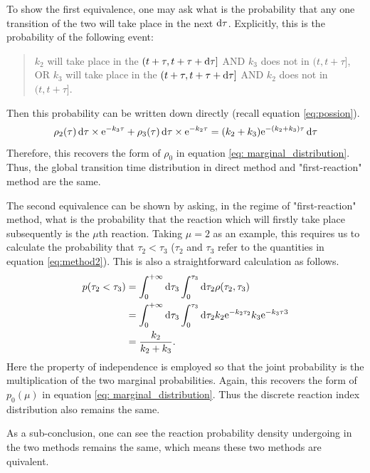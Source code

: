 		To show the first equivalence, one may ask what is the probability that any one transition of the two will take place in the next $\operatorname{d\!} \tau$. Explicitly, this is the probability of the following event:
		\begin{quote}
			$k_2$ will take place in the $(t+\tau, t+\tau+\operatorname{d\!} \tau]$ AND $k_3$ does not in $(t, t+\tau]$, \\ OR $k_3$ will take place in the $(t+\tau, t+\tau+\operatorname{d\!} \tau]$ AND $k_2$ does not in $(t, t+\tau]$.
		\end{quote}
		Then this probability can be written down directly (recall equation \eqref{eq:possion}).
		\begin{equation}
				\rho_2(\tau)\operatorname{d\!}\tau \times \mathrm{e}^{-k_3\tau} + 
				\rho_3(\tau)\operatorname{d\!}\tau \times \mathrm{e}^{-k_2\tau} 
				= (k_2 + k_3) \mathrm{e}^{-(k_2+k_3)\tau} \operatorname{d\!}\tau
		\end{equation}
		Therefore, this recovers the form of $\rho_0$ in equation \eqref{eq: marginal_distribution}. Thus, the global transition time distribution in direct method and "first-reaction" method are the same.

		The second equivalence can be shown by asking, in the regime of "first-reaction" method, what is the probability that the reaction which will firstly take place subsequently is the $\mu$th reaction. Taking $\mu=2$ as an example, this requires us to calculate the probability that $\tau_2<\tau_3$ ($\tau_2$ and $\tau_3$ refer to the quantities in equation \eqref{eq:method2}). This is also a straightforward calculation as follows.
		\begin{equation}
			\begin{aligned}
				p(\tau_2<\tau_3) &= \int_0^{+\infty} \operatorname{d\!} \tau_3 \int_0^{\tau_3} \operatorname{d\!} \tau_2 \rho(\tau_2,\tau_3) \\
				&=\int_0^{+\infty}\operatorname{d\!}\tau_3\int_0^{\tau_3}\operatorname{d\!}\tau_2 k_2\mathrm{e}^{-k_2\tau_2}k_3\mathrm{e}^{-k_3\tau3}\\
				&=\frac{k_2}{k_2+k_3}.
			\end{aligned}
		\end{equation}
		Here the property of independence is employed so that the joint probability is the multiplication of the two marginal probabilities.
		Again, this recovers the form of $p_0(\mu)$ in equation \eqref{eq: marginal_distribution}. Thus the discrete reaction index distribution also remains the same.

		As a sub-conclusion, one can see the reaction probability density undergoing in the two methods remains the same, which means these two methods are quivalent.
